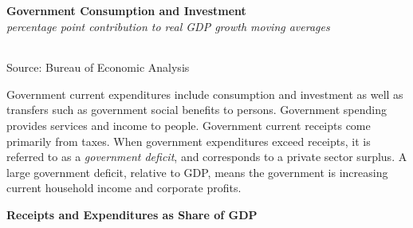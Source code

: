\documentclass{report}
\begin{document}
{\begin{minipage}{0.76\textwidth}
\normalsize \textbf{Government Consumption and Investment}\\
\footnotesize{\textit{percentage point contribution to real GDP growth \hspace{35mm} moving averages}}\\ 
 \setlength{\tabcolsep}{3.2pt} \color{black!90}
	{\renewcommand{\arraystretch}{1.7}
		\begin{tabular}{p{42mm} R{6.7mm} R{6.7mm} R{6.7mm} R{6.7mm} R{6.7mm} 
		   R{7.8mm} R{6.7mm} R{6.7mm} }
			  \hline
		\end{tabular}}\vspace{-2mm}
		
\footnotesize{Source: Bureau of Economic Analysis}
\end{minipage}
\newpage
\begin{minipage}{0.76\textwidth}    
\small Government current expenditures include consumption and investment as well as transfers such as government social benefits to persons. Government spending provides services and income to people. Government current receipts come primarily from taxes. When government expenditures exceed receipts, it is referred to as a \textit{government deficit}, and corresponds to a private sector surplus. A large government deficit, relative to GDP, means the government is increasing current household income and corporate profits.

 

 
\vspace{1mm}

\normalsize \textbf{Receipts and Expenditures as Share of GDP}


\end{minipage}}
\end{document}
